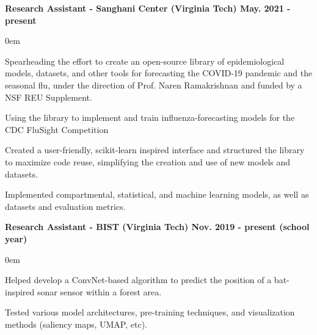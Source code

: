 \documentclass{article}
\begin{document}
\begin{center}
\begin{flushleft}
    \textbf{Research Assistant - Sanghani Center (Virginia Tech) \hfill May. 2021 - present}
    \begin{compactitem}
      \itemsep0em
      \item Spearheading the effort to create an open-source library of epidemiological models, datasets, and other tools for forecasting the COVID-19 pandemic and the seasonal flu, under the direction of Prof. Naren Ramakrishnan and funded by a NSF REU Supplement.
      \item Using the library to implement and train influenza-forecasting models for the CDC FluSight Competition
      \item Created a user-friendly, scikit-learn inspired interface and structured the library to maximize code reuse, simplifying the creation and use of new models and datasets.
      \item Implemented compartmental, statistical, and machine learning models, as well as datasets and evaluation metrics.
    \end{compactitem}

    \textbf{Research Assistant - BIST (Virginia Tech) \hfill Nov. 2019 - present (school year)}
    \begin{compactitem}
      \itemsep0em
      \item Helped develop a ConvNet-based algorithm to predict the position of a bat-inspired sonar sensor within a forest area.
      \item Tested various model architectures, pre-training techniques, and visualization methods (saliency maps, UMAP, etc).
    \end{compactitem}


\end{flushleft}
\end{center}
\end{document}

